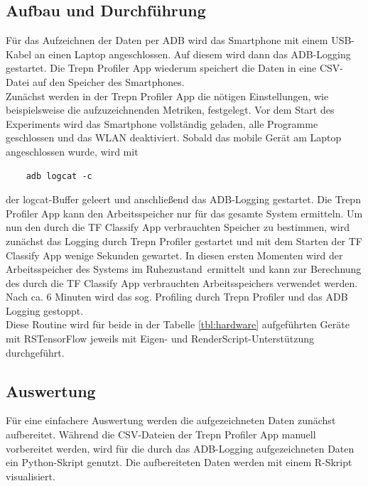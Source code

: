\subsection{Aufbau und Durchführung}
\label{subsec:aufbauexperiment}
Für das Aufzeichnen der Daten per ADB wird das Smartphone mit einem USB-Kabel an einen Laptop angeschlossen. Auf diesem wird dann das ADB-Logging gestartet. Die Trepn Profiler App wiederum speichert die Daten in eine CSV-Datei auf den Speicher des Smartphones. 
\\
Zunächst werden in der Trepn Profiler App die nötigen Einstellungen, wie beispielsweise die aufzuzeichnenden Metriken, festgelegt. Vor dem Start des Experiments wird das Smartphone vollständig geladen, alle Programme geschlossen und das WLAN deaktiviert. Sobald das mobile Gerät am Laptop angeschlossen wurde, wird mit 
\begin{lstlisting}
    adb logcat -c
\end{lstlisting}
der logcat-Buffer geleert und anschließend das ADB-Logging gestartet. Die Trepn Profiler App kann den Arbeitsspeicher nur für das gesamte System ermitteln. Um nun den durch die TF Classify App verbrauchten Speicher zu bestimmen, wird zunächst das Logging durch Trepn Profiler gestartet und mit dem Starten der TF Classify App wenige Sekunden gewartet. In diesen ersten Momenten wird der Arbeitsspeicher des Systems \glqq im Ruhezustand\grqq~ermittelt und kann zur Berechnung des durch die TF Classify App verbrauchten Arbeitsspeichers verwendet werden. Nach ca. 6 Minuten wird das sog. Profiling durch Trepn Profiler und das ADB Logging gestoppt. 
\\
Diese Routine wird für beide in der Tabelle \ref{tbl:hardware} aufgeführten Geräte mit RSTensorFlow jeweils mit Eigen- und RenderScript-Unterstützung durchgeführt. 

\subsection{Auswertung}
\label{subsec:experimentauswertung}
Für eine einfachere Auswertung werden die aufgezeichneten Daten zunächst aufbereitet. Während die CSV-Dateien der Trepn Profiler App manuell vorbereitet werden, wird für die durch das ADB-Logging aufgezeichneten Daten ein Python-Skript genutzt. Die aufbereiteten Daten werden mit einem R-Skript visualisiert. 
\\
